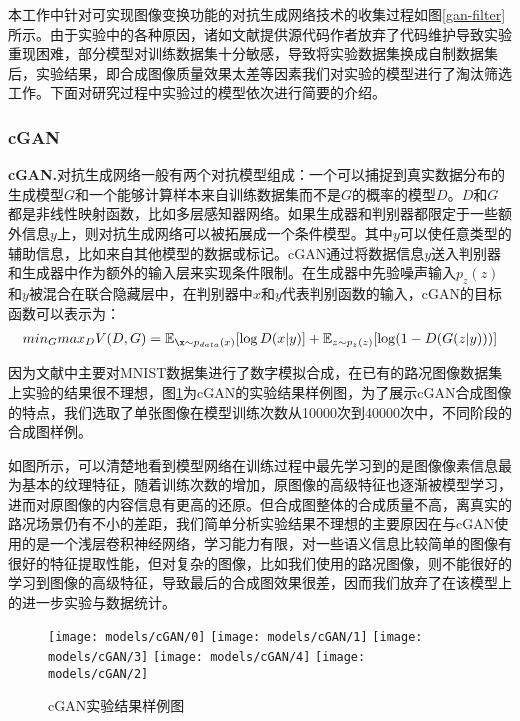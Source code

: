 本工作中针对可实现图像变换功能的对抗生成网络技术的收集过程如图\ref{gan-filter}所示。由于实验中的各种原因，诸如文献提供源代码作者放弃了代码维护导致实验重现困难，部分模型对训练数据集十分敏感，导致将实验数据集换成自制数据集后，实验结果，即合成图像质量效果太差等因素我们对实验的模型进行了淘汰筛选工作。下面对研究过程中实验过的模型依次进行简要的介绍。

\subsubsection{cGAN}

\textbf{cGAN.}\cite{cGAN}\quad 对抗生成网络一般有两个对抗模型组成：一个可以捕捉到真实数据分布的生成模型$G$和一个能够计算样本来自训练数据集而不是$G$的概率的模型$D$。$D$和$G$都是非线性映射函数，比如多层感知器网络。如果生成器和判别器都限定于一些额外信息$y$上，则对抗生成网络可以被拓展成一个条件模型。其中$y$可以使任意类型的辅助信息，比如来自其他模型的数据或标记。cGAN通过将数据信息$y$送入判别器和生成器中作为额外的输入层来实现条件限制。在生成器中先验噪声输入$p_z(z)$和$y$被混合在联合隐藏层中，在判别器中$x$和$y$代表判别函数的输入，cGAN的目标函数可以表示为：
\begin{gather}
    min_G max_D V(D,G)=\mathbb{E}_{\x\sim p_{data}(x)}[\log D(x|y)]+\mathbb{E}_{z\sim p_z(z)}[\log(1-D(G(z|y)))]
\end{gather}

因为文献中\cite{cGAN}主要对MNIST\cite{mnist}数据集进行了数字模拟合成，在已有的路况图像数据集上实验的结果很不理想，图\ref{fig:cgan}为cGAN的实验结果样例图，为了展示cGAN合成图像的特点，我们选取了单张图像在模型训练次数从10000次到40000次中，不同阶段的合成图样例。

如图所示，可以清楚地看到模型网络在训练过程中最先学习到的是图像像素信息最为基本的纹理特征，随着训练次数的增加，原图像的高级特征也逐渐被模型学习，进而对原图像的内容信息有更高的还原。但合成图整体的合成质量不高，离真实的路况场景仍有不小的差距，我们简单分析实验结果不理想的主要原因在与cGAN使用的是一个浅层卷积神经网络，学习能力有限，对一些语义信息比较简单的图像有很好的特征提取性能，但对复杂的图像，比如我们使用的路况图像，则不能很好的学习到图像的高级特征，导致最后的合成图效果很差，因而我们放弃了在该模型上的进一步实验与数据统计。 

\begin{figure}[h]
    \centering
    \texttt{[image: models/cGAN/0]}
    \texttt{[image: models/cGAN/1]}
    \texttt{[image: models/cGAN/3]}
    \texttt{[image: models/cGAN/4]}
    \texttt{[image: models/cGAN/2]}
    \caption{cGAN实验结果样例图}
    \label{fig:cgan}
\end{figure}

